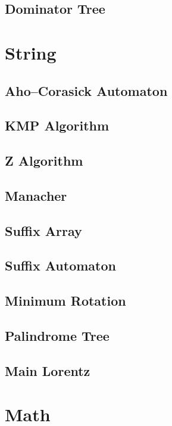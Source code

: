 \subsection{Dominator Tree}


\section{String}
\subsection{Aho–Corasick Automaton}

\subsection{KMP Algorithm}

\subsection{Z Algorithm}

\subsection{Manacher}

\subsection{Suffix Array}

\subsection{Suffix Automaton}

\subsection{Minimum Rotation}

\subsection{Palindrome Tree}

\subsection{Main Lorentz}


\section{Math}
